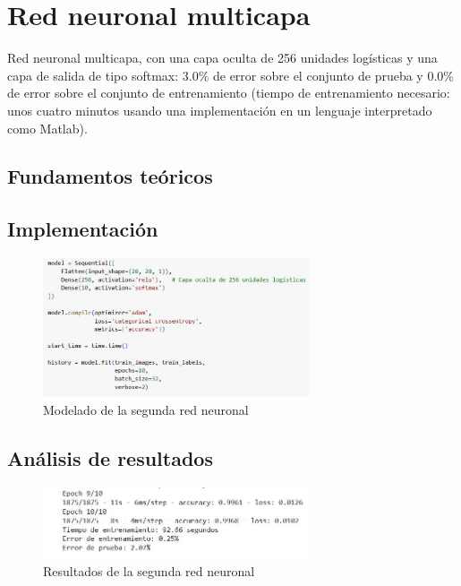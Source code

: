 \section{Red neuronal multicapa}

Red neuronal multicapa, con una capa oculta de 256 unidades logísticas y una capa
de salida de tipo softmax: 3.0\% de error sobre el conjunto de prueba y 0.0\% de error
sobre el conjunto de entrenamiento (tiempo de entrenamiento necesario: unos cuatro
minutos usando una implementación en un lenguaje interpretado como Matlab).

\subsection{Fundamentos teóricos}

\subsection{Implementación}

\begin{figure}[H]
	\centering
	\includegraphics[width=0.7\textwidth]{imgs/model-red2.JPG}
	\caption{Modelado de la segunda red neuronal}
	\label{fig:model-red2}
\end{figure}

\subsection{Análisis de resultados}

\begin{figure}[H]
	\centering
	\includegraphics[width=0.7\textwidth]{imgs/results-red2.JPG}
	\caption{Resultados de la segunda red neuronal}
	\label{fig:results-red2}
\end{figure}


